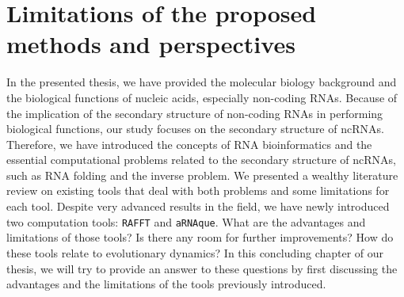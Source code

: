 \chapter{Limitations of the proposed methods  and perspectives}\label{ch:conclusion}
In the presented thesis, we have provided the molecular biology background and the biological functions of nucleic acids, especially non-coding RNAs. Because of the implication of the secondary structure of non-coding RNAs in performing biological functions, our study focuses on the secondary structure of ncRNAs. Therefore, we have introduced the concepts of RNA bioinformatics and the essential computational problems related to the secondary structure of ncRNAs, such as RNA folding and the inverse problem. We presented a wealthy literature review on existing tools that deal with both problems and some limitations for each tool. Despite very advanced results in the field, we have newly introduced two computation tools: \texttt{RAFFT} and \texttt{aRNAque}. What are the advantages and limitations of those tools? Is there any room for further improvements? How do these tools relate to evolutionary dynamics? In this concluding chapter of our thesis, we will try to provide an answer to these questions by first discussing the advantages and the limitations of the tools previously introduced. 

